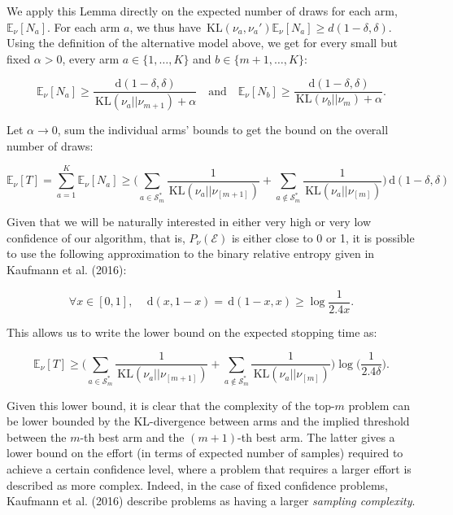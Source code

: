 \documentclass[11pt,]{article}
\newcommand{\KL}{\,\text{KL}}
\newcommand{\der}{\,\text{d}}
\begin{document}
We apply this Lemma directly on the expected number of draws for each
arm, \(\mathbb{E}_{\nu}[N_a]\). For each arm \(a\), we thus have
\(\KL(\nu_a, \nu_a') \mathbb{E}_{\nu}[N_a] \geq d(1-\delta, \delta)\).
Using the definition of the alternative model above, we get for every
small but fixed \(\alpha > 0\), every arm \(a \in \{1, \dots, K\}\) and
\(b \in \{m+1, \dots, K\}\):

\begin{equation*}
\mathbb{E}_{\nu}[N_a] \geq \frac{\der(1-\delta, \delta)}{\KL (\nu_a || \nu_{m+1}) + \alpha} \quad \text{and} \quad \mathbb{E}_{\nu}[N_b] \geq \frac{\der(1-\delta, \delta)}{\KL (\nu_b || \nu_{m}) + \alpha}.
\end{equation*}

Let \(\alpha \to 0\), sum the individual arms' bounds to get the bound
on the overall number of draws:

\begin{equation*}
\mathbb{E}_{\nu}[T] = \sum_{a=1}^K \mathbb{E}_{\nu}[N_a] \geq \Big( \sum_{a \in \mathcal{S}_m^*} \frac{1}{\KL(\nu_a|| \nu_{[m+1]})} + \sum_{a \notin \mathcal{S}_m^*} \frac{1}{\KL(\nu_a|| \nu_{[m]})} \Big) \der(1-\delta, \delta)
\end{equation*}

Given that we will be naturally interested in either very high or very
low confidence of our algorithm, that is, \(P_\nu(\mathcal{E})\) is
either close to 0 or 1, it is possible to use the following
approximation to the binary relative entropy given in Kaufmann et al.
(2016):

\begin{equation}\label{bre_approx}
\forall x \in [0,1], \quad \der(x,1-x) = \der(1-x,x) \geq \log \frac{1}{2.4x}.
\end{equation}

This allows us to write the lower bound on the expected stopping time
as:

\begin{equation*}
\mathbb{E}_{\nu}[T] \geq \Big( \sum_{a \in \mathcal{S}_m^*} \frac{1}{\KL(\nu_a|| \nu_{[m+1]})} + \sum_{a \notin \mathcal{S}_m^*} \frac{1}{\KL(\nu_a|| \nu_{[m]})} \Big) \log \big(\frac{1}{2.4\delta} \big).
\end{equation*}

Given this lower bound, it is clear that the complexity of the top-\(m\)
problem can be lower bounded by the KL-divergence between arms and the
implied threshold between the \(m\)-th best arm and the \((m+1)\)-th
best arm. The latter gives a lower bound on the effort (in terms of
expected number of samples) required to achieve a certain confidence
level, where a problem that requires a larger effort is described as
more complex. Indeed, in the case of fixed confidence problems, Kaufmann
et al. (2016) describe problems as having a larger \emph{sampling
complexity}.
\end{document}
